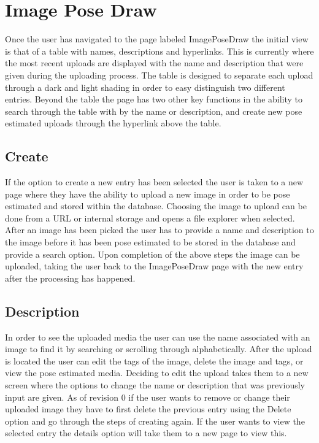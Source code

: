 \documentclass{scrreprt}
\begin{document}
\section{Image Pose Draw}
Once the user has navigated to the page labeled ImagePoseDraw the initial view is that of a table with names, descriptions and hyperlinks. This is currently where the most recent uploads are displayed with the name and description that were given during the uploading process. The table is designed to separate each upload through a dark and light shading in order to easy distinguish two different entries. Beyond the table the page has two other key functions in the ability to search through the table with by the name or description, and create new pose estimated uploads through the hyperlink above the table. 

\subsection{Create}
If the option to create a new entry has been selected the user is taken to a new page where they have the ability to upload a new image in order to be pose estimated and stored within the database. Choosing the image to upload can be done from a URL or internal storage and opens a file explorer when selected. After an image has been picked the user has to provide a name and description to the image before it has been pose estimated to be stored in the database and provide a search option. Upon completion of the above steps the image can be uploaded, taking the user back to the ImagePoseDraw page with the new entry after the processing has happened.

\subsection{Description}
In order to see the uploaded media the user can use the name associated with an image to find it by searching or scrolling through alphabetically. After the upload is located the user can edit the tags of the image, delete the image and tags, or view the pose estimated media. Deciding to edit the upload takes them to a new screen where the options to change the name or description that was previously input are given. As of revision 0 if the user wants to remove or change their uploaded image they have to first delete the previous entry using the Delete option and go through the steps of creating again. If the user wants to view the selected entry the details option will take them to a new page to view this.
\end{document}
